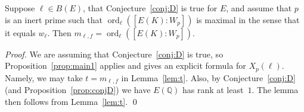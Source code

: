 \documentclass{oupau}
\DeclareMathOperator{\ord}{ord}
\newcommand{\QQ}{\mathbb{Q}}
\begin{document}
\begin{lemma}\label{lem:index}
  Suppose $\ell\in B(E)$, that Conjecture~\ref{conj:D} is true for
  $E$, and assume that $p$ is an inert prime such that
  $\ord_{\ell}([E(K):W_p])$ is maximal in the sense that it 
equals $w_{\ell}$. Then $m_{\ell,f} =
  \ord_{\ell}([E(K):W_p])$.
\end{lemma}
\begin{proof}
\noindent{}We are assuming 
that Conjecture~\ref{conj:D} is true, so Proposition~\ref{prop:main1} applies
and gives an explicit formula for $X_p(\ell)$.
Namely, we may take $t=m_{\ell,f}$ in Lemma~\ref{lem:t}.
Also, by Conjecture~\ref{conj:D} (and Proposition~\ref{prop:conjD}) we have $E(\QQ)$
has rank at least~$1$.  The lemma then follows from Lemma~\ref{lem:t}.
\qed\end{proof}
\end{document}
